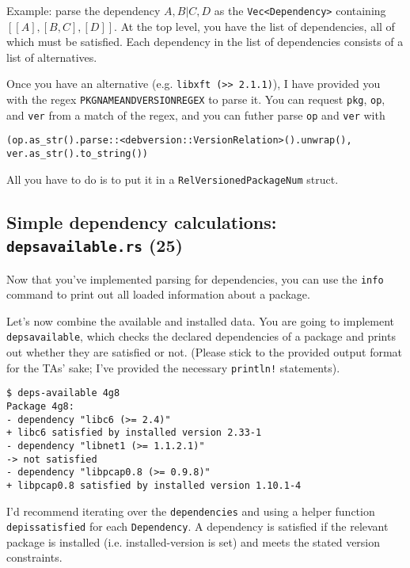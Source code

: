 \documentclass[12pt]{article}
\renewcommand{\_}{\kern-1.5pt\textunderscore\kern-1.5pt}
\begin{document}
\vspace{1em}
Example: parse the dependency $A, B | C, D$ as the \verb+Vec<Dependency>+ containing $[[A], [B, C], [D]]$. At the top level, you have the list of dependencies, all of which must be satisfied. Each dependency in the list of dependencies consists of a list of alternatives.

\vspace{1em}
Once you have an alternative (e.g. \texttt{libxft (>> 2.1.1)}), I have provided you with the regex \texttt{PKGNAME\_AND\_VERSION\_REGEX} 
to parse it.
You can request \texttt{pkg}, \texttt{op}, and \texttt{ver} from a match of the regex, and you can futher parse \texttt{op}
and \texttt{ver} with
{\small
\begin{verbatim}
(op.as_str().parse::<debversion::VersionRelation>().unwrap(), ver.as_str().to_string())
\end{verbatim}
}
All you have to do is to put it in a \texttt{RelVersionedPackageNum} struct.

\subsection*{Simple dependency calculations: \texttt{deps\_available.rs} (25)}
Now that you've implemented parsing for dependencies, you can use the \texttt{info} command to print out all loaded
information about a package.\par

\vspace{1em}
Let's now combine the available and installed data. You are going to implement \texttt{deps\_available},
which checks the declared dependencies of a package and prints out whether they are satisfied or not.
(Please stick to the provided output format for the TAs' sake; I've provided the necessary \texttt{println!} 
statements).

\begin{verbatim}
$ deps-available 4g8
Package 4g8:
- dependency "libc6 (>= 2.4)"
+ libc6 satisfied by installed version 2.33-1
- dependency "libnet1 (>= 1.1.2.1)"
-> not satisfied
- dependency "libpcap0.8 (>= 0.9.8)"
+ libpcap0.8 satisfied by installed version 1.10.1-4
\end{verbatim}
I'd recommend iterating over the \texttt{dependencies} and using a helper function \texttt{dep\_is\_satisfied}
for each \texttt{Dependency}. A dependency is satisfied if the relevant package is installed (i.e. installed-version
is set) and meets the stated version constraints. 
\end{document}
